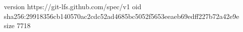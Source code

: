 version https://git-lfs.github.com/spec/v1
oid sha256:29918356cb140570ac2cdc52ad4685bc5052f5653eeaeb69edff227b72a42e9e
size 7718
